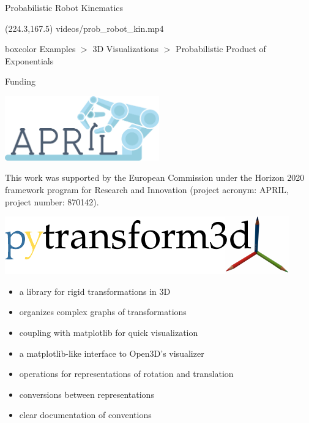 \documentclass[14pt,aspectratio=169]{beamer}
\begin{document}
\begin{frame}[fragile]{Probabilistic Robot Kinematics}
\begin{center}
\makebox(224.3,167.5){
{videos/prob_robot_kin.mp4}}
\end{center}

\begin{beamercolorbox}[wd=0.9\textwidth,sep=5pt]{boxcolor}
Examples $>$ 3D Visualizations $>$ Probabilistic Product of Exponentials
\end{beamercolorbox}
\end{frame}

\begin{frame}{Funding}
\begin{center}
\includegraphics[width=0.5\textwidth]{images/logo_april}
\end{center}
This work was supported by the European Commission under the Horizon 2020
framework program for Research and Innovation (project acronym: APRIL, project
number: 870142).
\end{frame}

\begin{frame}
\includegraphics[width=\textwidth]{images/logo}

\begin{itemize}
\item a library for rigid transformations in 3D
\item organizes complex graphs of transformations
\item coupling with matplotlib for quick visualization
\item a matplotlib-like interface to Open3D’s visualizer
\item operations for representations of rotation and translation
\item conversions between representations
\item clear documentation of conventions
\end{itemize}
\end{frame}
\end{document}
